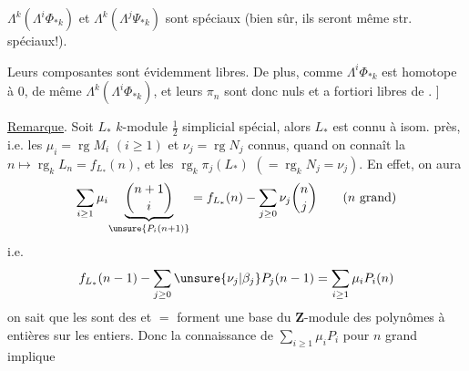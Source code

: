 $\Lambda^k(\Lambda^i\Phi_{*k})$ et $\Lambda^k(\Lambda^j\Psi_{*k})$ sont spéciaux
(bien sûr, ils seront même str. spéciaux!).

Leurs composantes sont évidemment
libres. De plus, comme $\Lambda^i\Phi_{*k}$ est
homotope à $0$, de même $\Lambda^k(\Lambda^i\Phi_{*k})$, et
leurs $\pi_n$ sont donc nuls et a fortiori
libres de .
]

\uline{Remarque}. Soit $L_*$ $k$-module $\frac12$ simplicial
 spécial, alors $L_*$ est connu à isom. près,
i.e. les $\mu_i=\operatorname{rg}M_i$ $(i\geq1)$ et $\nu_j=\operatorname{rg}N_j$
 
connus, quand on connaît la 
$n\longmapsto\operatorname{rg}_kL_n=f_{L_*}(n)$,
 et les
$\operatorname{rg}_k\pi_j(L_*)$ $(=\operatorname{rg}_kN_j=\nu_j)$.
En effet,
on aura
\[
\sum_{i\geq1}\mu_i\underset{\unsure{P_i(n+1)}}{\underbrace{\binom{n+1}{i}}}
=f_{L_*}(n)-\sum_{j\geq0}\nu_j\binom{n}{j}
\qquad(n\text{ grand})
\]
i.e.
\[
f_{L_*}(n-1)-\sum_{j\geq0}\unsure{\nu_j|\beta_j}P_j(n-1)
=\sum_{i\geq1}\mu_iP_i(n)
\]
on sait que les  
sont des
 et $=$ forment une
base du $\mathbf Z$-module des polynômes
à   entières sur les entiers.
Donc la connaissance de $\sum_{i\geq1}\mu_iP_i$
pour $n$ grand implique
